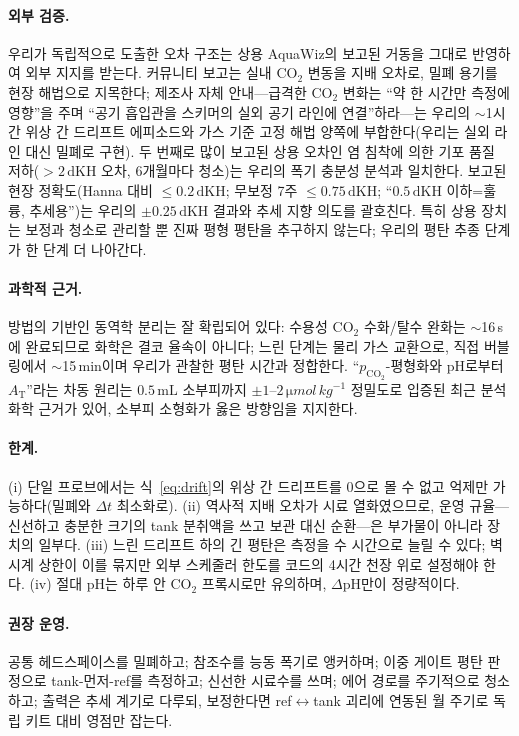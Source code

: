 \documentclass[11pt]{article}
\newcommand{\dpH}{\ensuremath{\Delta\mathrm{pH}}}
\newcommand{\dkh}{\ensuremath{\,\mathrm{dKH}}}
\newcommand{\co}{\ensuremath{\mathrm{CO_2}}}
\newcommand{\pco}{\ensuremath{p_{\mathrm{CO_2}}}}
\newcommand{\at}{\ensuremath{A_\mathrm{T}}}
\begin{document}
\paragraph{외부 검증.} 우리가 독립적으로 도출한 오차 구조는 상용 AquaWiz의 보고된
거동을 그대로 반영하여 외부 지지를 받는다. 커뮤니티 보고는 실내 \co{} 변동을 지배
오차로, 밀폐 용기를 현장 해법으로 지목한다; 제조사 자체 안내---급격한 \co{} 변화는
``약 한 시간만 측정에 영향''을 주며 ``공기 흡입관을 스키머의 실외 공기 라인에
연결''하라---는 우리의 $\sim$1시간 위상 간 드리프트 에피소드와 가스 기준 고정 해법
양쪽에 부합한다(우리는 실외 라인 대신 밀폐로 구현). 두 번째로 많이 보고된 상용 오차인
염 침착에 의한 기포 품질 저하($>2\dkh$ 오차, 6개월마다 청소)는 우리의 폭기 충분성
분석과 일치한다. 보고된 현장 정확도(Hanna 대비 $\le0.2\dkh$; 무보정 7주 $\le0.75\dkh$;
``$0.5\dkh$ 이하=훌륭, 추세용'')는 우리의 $\pm0.25\dkh$ 결과와 추세 지향 의도를
괄호친다. 특히 상용 장치는 보정과 청소로 관리할 뿐 진짜 평형 평탄을 추구하지 않는다;
우리의 평탄 추종 단계가 한 단계 더 나아간다.

\paragraph{과학적 근거.} 방법의 기반인 동역학 분리는 잘 확립되어 있다: 수용성 \co{}
수화/탈수 완화는 $\sim$16\,s에 완료되므로\cite{johnson1982} 화학은 결코 율속이 아니다;
느린 단계는 물리 가스 교환으로, 직접 버블링에서 $\sim$15\,min이며\cite{takahashi}
우리가 관찰한 평탄 시간과 정합한다. ``\pco{}-평형화와 pH로부터 \at{}''라는 차동 원리는
$0.5\,\mathrm{mL}$ 소부피까지 $\pm1$--$2\,\si{\micro mol\,kg^{-1}}$ 정밀도로 입증된
최근 분석화학 근거가 있어\cite{fleger2025}, 소부피 소형화가 옳은 방향임을 지지한다.

\paragraph{한계.} (i) 단일 프로브에서는 식~\eqref{eq:drift}의 위상 간 드리프트를 0으로
몰 수 없고 억제만 가능하다(밀폐와 $\Delta t$ 최소화로). (ii) 역사적 지배 오차가 시료
열화였으므로, 운영 규율---신선하고 충분한 크기의 tank 분취액을 쓰고 보관 대신
순환---은 부가물이 아니라 장치의 일부다. (iii) 느린 드리프트 하의 긴 평탄은 측정을 수
시간으로 늘릴 수 있다; 벽시계 상한이 이를 묶지만 외부 스케줄러 한도를 코드의 4시간
천장 위로 설정해야 한다. (iv) 절대 pH는 하루 안 \co{} 프록시로만 유의하며, \dpH{}만이
정량적이다.

\paragraph{권장 운영.} 공통 헤드스페이스를 밀폐하고; 참조수를 능동 폭기로 앵커하며;
이중 게이트 평탄 판정으로 tank-먼저-ref를 측정하고; 신선한 시료수를 쓰며; 에어 경로를
주기적으로 청소하고; 출력은 추세 계기로 다루되, 보정한다면 ref$\leftrightarrow$tank
괴리에 연동된 월 주기로 독립 키트 대비 영점만 잡는다.
\end{document}
